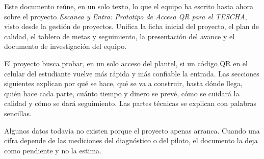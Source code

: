 Este documento reúne, en un solo texto, lo que el equipo ha escrito hasta ahora
sobre el proyecto \textit{Escanea y Entra: Prototipo de Acceso QR para el
TESCHA}, visto desde la gestión de proyectos. Unifica la ficha inicial del
proyecto, el plan de calidad, el tablero de metas y seguimiento, la
presentación del avance y el documento de investigación del equipo.

El proyecto busca probar, en un solo acceso del plantel, si un código QR en el
celular del estudiante vuelve más rápida y más confiable la entrada. Las
secciones siguientes explican por qué se hace, qué se va a construir, hasta
dónde llega, quién hace cada parte, cuánto tiempo y dinero se prevé, cómo se
cuidará la calidad y cómo se dará seguimiento. Las partes técnicas se explican
con palabras sencillas.

Algunos datos todavía no existen porque el proyecto apenas arranca. Cuando
una cifra depende de las mediciones del diagnóstico o del piloto, el documento
la deja como pendiente y no la estima.
